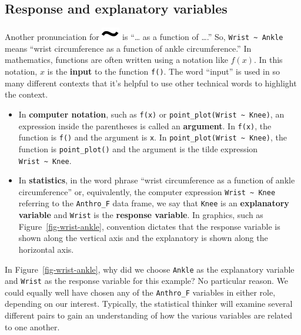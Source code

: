 \documentclass[
  letterpaper,
  DIV=11,
  numbers=noendperiod,
  oneside]{scrartcl}
\begin{document}
\subsection{Response and explanatory
variables}\label{response-and-explanatory-variables}

Another pronunciation for \includegraphics{www/tilde.png} is ``\ldots{}
as a function of \ldots.'' So, \texttt{Wrist~\textasciitilde{}~Ankle}
means ``wrist circumference as a function of ankle circumference.'' In
mathematics, functions are often written using a notation like \(f(x)\).
In this notation, \(x\) is the \textbf{input} to the function
\texttt{f()}. The word ``input'' is used in so many different contexts
that it's helpful to use other technical words to highlight the context.

\begin{itemize}
\item
  In \textbf{computer notation}, such as \texttt{f(x)} or
  \texttt{point\_plot(Wrist\ \textasciitilde{}\ Knee)}, an expression
  inside the parentheses is called an \textbf{argument}. In
  \texttt{f(x)}, the function is \texttt{f()} and the argument is
  \texttt{x}. In \texttt{point\_plot(Wrist\ \textasciitilde{}\ Knee)},
  the function is \texttt{point\_plot()} and the argument is the tilde
  expression \texttt{Wrist\ \textasciitilde{}\ Knee}.
\item
  In \textbf{statistics}, in the word phrase ``wrist circumference as a
  function of ankle circumference'' or, equivalently, the computer
  expression \texttt{Wrist\ \textasciitilde{}\ Knee} referring to the
  \texttt{Anthro\_F} data frame, we say that \texttt{Knee} is an
  \textbf{explanatory variable} and \texttt{Wrist} is the
  \textbf{response variable}. In graphics, such as
  Figure~\ref{fig-wrist-ankle}, convention dictates that the response
  variable is shown along the vertical axis and the explanatory is shown
  along the horizontal axis.
\end{itemize}

In Figure~\ref{fig-wrist-ankle}, why did we choose \texttt{Ankle} as the
explanatory variable and \texttt{Wrist} as the response variable for
this example? No particular reason. We could equally well have chosen
any of the \texttt{Anthro\_F} variables in either role, depending on our
interest. Typically, the statistical thinker will examine several
different pairs to gain an understanding of how the various variables
are related to one another.
\end{document}
